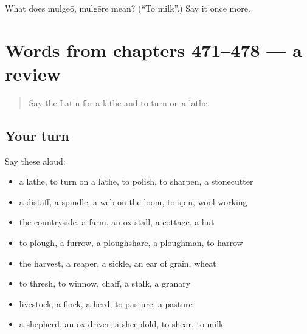 \begin{tcolorbox}[breakable,colback=teal!4,colframe=teal!35!black,title={Before you move on}]
What does mulgeō, mulgēre mean? (\textquotedblleft{}To milk\textquotedblright{}.) Say it once more.
\end{tcolorbox}
\section[(dialogue)]{Words from chapters 471–478 — a review}

\label{lesson:LA-R478-review-471-478}



\begin{quote}
Say the Latin for a lathe and to turn on a lathe.
\end{quote}

\subsection*{Your turn}
Say these aloud:

\begin{itemize}
\raggedright
  \item a lathe, to turn on a lathe, to polish, to sharpen, a stonecutter
  \item a distaff, a spindle, a web on the loom, to spin, wool-working
  \item the countryside, a farm, an ox stall, a cottage, a hut
  \item to plough, a furrow, a ploughshare, a ploughman, to harrow
  \item the harvest, a reaper, a sickle, an ear of grain, wheat
  \item to thresh, to winnow, chaff, a stalk, a granary
  \item livestock, a flock, a herd, to pasture, a pasture
  \item a shepherd, an ox-driver, a sheepfold, to shear, to milk
\end{itemize}

